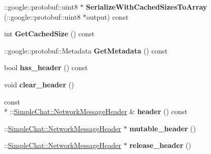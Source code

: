 \begin{DoxyCompactItemize}
\item 
\hypertarget{classSimpleChat_1_1NetworkMessage_afbc3848b3ae57b9ac4fcb4a1066386a7}{\-::google\-::protobuf\-::uint8 $\ast$ {\bfseries Serialize\-With\-Cached\-Sizes\-To\-Array} (\-::google\-::protobuf\-::uint8 $\ast$output) const }\label{classSimpleChat_1_1NetworkMessage_afbc3848b3ae57b9ac4fcb4a1066386a7}

\item 
\hypertarget{classSimpleChat_1_1NetworkMessage_a9da9957343256049926de81427192a3e}{int {\bfseries Get\-Cached\-Size} () const }\label{classSimpleChat_1_1NetworkMessage_a9da9957343256049926de81427192a3e}

\item 
\hypertarget{classSimpleChat_1_1NetworkMessage_a353ea5839a3f4094ff329555be0deb80}{\-::google\-::protobuf\-::\-Metadata {\bfseries Get\-Metadata} () const }\label{classSimpleChat_1_1NetworkMessage_a353ea5839a3f4094ff329555be0deb80}

\item 
\hypertarget{classSimpleChat_1_1NetworkMessage_aa690cbc56fe136ebff5f2cd7cb2d1bf3}{bool {\bfseries has\-\_\-header} () const }\label{classSimpleChat_1_1NetworkMessage_aa690cbc56fe136ebff5f2cd7cb2d1bf3}

\item 
\hypertarget{classSimpleChat_1_1NetworkMessage_a4aa5e63844f15435b24365e56dcca8bf}{void {\bfseries clear\-\_\-header} ()}\label{classSimpleChat_1_1NetworkMessage_a4aa5e63844f15435b24365e56dcca8bf}

\item 
\hypertarget{classSimpleChat_1_1NetworkMessage_aa9e813c66ce0a4cde812988f9e32296a}{const \\*
\-::\hyperlink{classSimpleChat_1_1NetworkMessageHeader}{Simple\-Chat\-::\-Network\-Message\-Header} \& {\bfseries header} () const }\label{classSimpleChat_1_1NetworkMessage_aa9e813c66ce0a4cde812988f9e32296a}

\item 
\hypertarget{classSimpleChat_1_1NetworkMessage_a2b505ba16122a5466124623533110265}{\-::\hyperlink{classSimpleChat_1_1NetworkMessageHeader}{Simple\-Chat\-::\-Network\-Message\-Header} $\ast$ {\bfseries mutable\-\_\-header} ()}\label{classSimpleChat_1_1NetworkMessage_a2b505ba16122a5466124623533110265}

\item 
\hypertarget{classSimpleChat_1_1NetworkMessage_a9e88e4532462d9e38633c67cffb07534}{\-::\hyperlink{classSimpleChat_1_1NetworkMessageHeader}{Simple\-Chat\-::\-Network\-Message\-Header} $\ast$ {\bfseries release\-\_\-header} ()}\label{classSimpleChat_1_1NetworkMessage_a9e88e4532462d9e38633c67cffb07534}


\end{DoxyCompactItemize}
